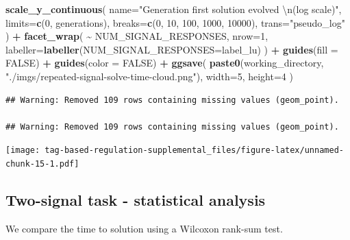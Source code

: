 \documentclass[
]{book}
\newenvironment{Shaded}{\begin{snugshade}}{\end{snugshade}}
\newcommand{\CharTok}[1]{\textcolor[rgb]{0.31,0.60,0.02}{#1}}
\newcommand{\DataTypeTok}[1]{\textcolor[rgb]{0.13,0.29,0.53}{#1}}
\newcommand{\DecValTok}[1]{\textcolor[rgb]{0.00,0.00,0.81}{#1}}
\newcommand{\KeywordTok}[1]{\textcolor[rgb]{0.13,0.29,0.53}{\textbf{#1}}}
\newcommand{\NormalTok}[1]{#1}
\newcommand{\OperatorTok}[1]{\textcolor[rgb]{0.81,0.36,0.00}{\textbf{#1}}}
\newcommand{\OtherTok}[1]{\textcolor[rgb]{0.56,0.35,0.01}{#1}}
\newcommand{\StringTok}[1]{\textcolor[rgb]{0.31,0.60,0.02}{#1}}
\begin{document}
\begin{Shaded}
\begin{Highlighting}[]
\StringTok{  }\KeywordTok{scale\_y\_continuous}\NormalTok{(}
    \DataTypeTok{name=}\StringTok{"Generation first solution evolved }\CharTok{\textbackslash{}n}\StringTok{(log scale)"}\NormalTok{,}
    \DataTypeTok{limits=}\KeywordTok{c}\NormalTok{(}\DecValTok{0}\NormalTok{, generations),}
    \DataTypeTok{breaks=}\KeywordTok{c}\NormalTok{(}\DecValTok{0}\NormalTok{, }\DecValTok{10}\NormalTok{, }\DecValTok{100}\NormalTok{, }\DecValTok{1000}\NormalTok{, }\DecValTok{10000}\NormalTok{),}
    \DataTypeTok{trans=}\StringTok{"pseudo\_log"}
\NormalTok{  ) }\OperatorTok{+}
\StringTok{  }\KeywordTok{facet\_wrap}\NormalTok{(}
    \OperatorTok{\textasciitilde{}}\StringTok{ }\NormalTok{NUM\_SIGNAL\_RESPONSES,}
    \DataTypeTok{nrow=}\DecValTok{1}\NormalTok{,}
    \DataTypeTok{labeller=}\KeywordTok{labeller}\NormalTok{(}\DataTypeTok{NUM\_SIGNAL\_RESPONSES=}\NormalTok{label\_lu)}
\NormalTok{  ) }\OperatorTok{+}
\StringTok{  }\KeywordTok{guides}\NormalTok{(}\DataTypeTok{fill =} \OtherTok{FALSE}\NormalTok{) }\OperatorTok{+}
\StringTok{  }\KeywordTok{guides}\NormalTok{(}\DataTypeTok{color =} \OtherTok{FALSE}\NormalTok{) }\OperatorTok{+}
\StringTok{  }\KeywordTok{ggsave}\NormalTok{(}
    \KeywordTok{paste0}\NormalTok{(working\_directory, }\StringTok{"./imgs/repeated{-}signal{-}solve{-}time{-}cloud.png"}\NormalTok{),}
    \DataTypeTok{width=}\DecValTok{5}\NormalTok{,}
    \DataTypeTok{height=}\DecValTok{4}
\NormalTok{  )}
\end{Highlighting}
\end{Shaded}

\begin{verbatim}
## Warning: Removed 109 rows containing missing values (geom_point).

## Warning: Removed 109 rows containing missing values (geom_point).
\end{verbatim}

\texttt{[image: tag-based-regulation-supplemental\_files/figure-latex/unnamed-chunk-15-1.pdf]}

\hypertarget{two-signal-task---statistical-analysis}{%
\subsection{Two-signal task - statistical analysis}\label{two-signal-task---statistical-analysis}}

We compare the time to solution using a Wilcoxon rank-sum test.
\end{document}
